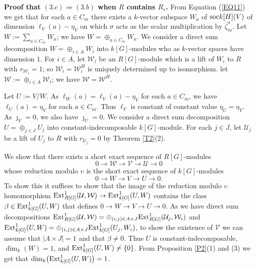 \documentclass[11pt]{amsart}
\def\soc{\textup{soc}}
\def\Ext{\textup{Ext}}
\begin{document}
{\bf Proof that $(3.c)\Rightarrow (3.b)$ when $R$ contains $R_s$.} From Equation (\ref{EQ11}) we get that for each $a\in C_m$ there exists a $k$-vector subspace $W_a$ of $\soc{k[H]}(V)$ of dimension $\ell_V(a)-\eta_V$ on which $\sigma$ acts as the scalar multiplication by $\overline{\zeta}_m^a$. Let $W:=\sum_{a\in C_m} W_a$; we have $W=\oplus_{a\in C_m} W_a$. We consider a direct sum decomposition $W=\oplus_{i\in A} W_i$ into $k[G]$-modules who as $k$-vector spaces have dimension $1$. For $i\in A$, let $\mathcal W_i$ be an $R[G]$-module which is a lift of $W_i$ to $R$ with $r_{\mathcal W_i}=1$; so $\mathcal W_i=\mathcal W_i^H$ is uniquely determined up to isomorphism. let $\mathcal W:=\oplus_{i\in A} \mathcal W_i$; we have $\mathcal W=\mathcal W^H$.

Let $U:=V/W$. As $\ell_W(a)=\ell_V(a)-\eta_V$ for each $a\in C_m$, we have $\ell_U(a)=\eta_V$ for each $a\in C_m$. Thus $\ell_V$ is constant of constant value $\eta_U=\eta_V$. As $\jmath_V=0$, we also have $\jmath_U=0$. We consider a direct sum decomposition $U=\oplus_{j\in J} U_j$ into constant-indecomposable $k[G]$-module. For each $j\in J$, let $\mathcal U_j$ be a lift of $U_j$ to $R$ with $r_{\mathcal U_j}=0$ by Theorem \ref{T2}(2). 

We show that there exists a short exact sequence of $R[G]$-modules
$$0\rightarrow\mathcal W\rightarrow\mathcal V\rightarrow\mathcal U\rightarrow 0$$
whose reduction modulo $\upsilon$ is the short exact sequence of $k[G]$-modules 
$$0\rightarrow W\rightarrow V\rightarrow U\rightarrow 0.$$
To show this it suffices to show that the image of the reduction modulo $\upsilon$ homomorphism $\Ext^1_{R[G]}(\mathcal U,\mathcal W)\rightarrow \Ext^1_{k[G]}(U,W)$ contains the class $\beta\in\Ext^1_{k[G]}(U,W)$ that defines $0\rightarrow W\rightarrow V\rightarrow U\rightarrow 0$. As we have direct sum decompositions $\Ext^1_{R[G]}(\mathcal U,\mathcal W)=\oplus_{(i,j)\in A\times J} \Ext^1_{R[G]}(\mathcal U_j,\mathcal W_i)$ and $\Ext^1_{k[G]}(U,W)=\oplus_{(i,j)\in A\times J} \Ext^1_{k[G]}(U_j,W_i)$, to show the existence of $\mathcal V$ we can assume that $|A\times J|=1$ and that  $\beta\neq 0$. Thus $U$ is constant-indecomposable, $\dim_k(W)=1$, and $\Ext^1_{k[G]}(U,W)\neq \{0\}$. From Proposition \ref{P2}(1) and (3) we get that $\dim_k\bigl(\Ext^1_{k[G]}(U,W)\bigr)=1$.
\end{document}
